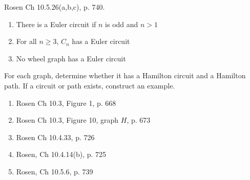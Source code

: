 \begin{questions}
\begin{solution}
    \end{solution}



 Rosen Ch 10.5.26(a,b,c), p. 740.
    \ifprintanswers
        \vspace{-10pt}
    \fi
    \begin{solution}
    \begin{enumerate}[label=(\alph*), topsep=0pt, itemsep=0pt, parsep=0pt]
        \item There is a Euler circuit if $n$ is odd and $n>1$
        \item For all $n\geq3$, $C_n$ has a Euler circuit
        \item No wheel graph has a Euler circuit
    \end{enumerate}
    \end{solution}



 For each graph, determine whether it has a Hamilton circuit and a Hamilton path.  If a circuit or path exists, construct an example.
\begin{enumerate}[label=(\alph*), topsep=0pt, itemsep=0pt, parsep=0pt]
    \item Rosen Ch 10.3, Figure 1, p. 668
    \item Rosen Ch 10.3, Figure 10, graph $H$, p. 673
    \item Rosen Ch 10.4.33, p. 726
    \item Rosen, Ch 10.4.14(b), p. 725
    \item Rosen, Ch 10.5.6, p. 739
\end{enumerate}


\end{questions}
